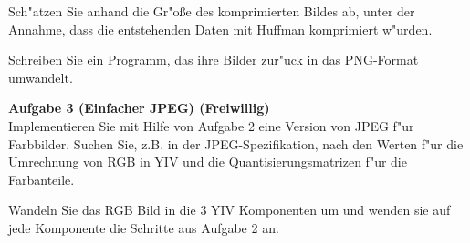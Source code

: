 \documentclass[a4paper]{article}
\begin{document}
Sch"atzen Sie anhand die Gr"o{\ss}e des komprimierten Bildes ab, unter der Annahme, dass die entstehenden Daten mit Huffman komprimiert w"urden.

Schreiben Sie ein Programm, das ihre Bilder zur"uck in das PNG-Format umwandelt.


\bigskip


{\bf Aufgabe 3  \quad(Einfacher JPEG) \quad (Freiwillig)}\\
Implementieren Sie mit Hilfe von Aufgabe 2 eine Version von JPEG f"ur Farbbilder. Suchen Sie, z.B. in der JPEG-Spezifikation, nach den Werten f"ur die Umrechnung von RGB in YIV und die Quantisierungsmatrizen f"ur die Farbanteile.

Wandeln Sie das RGB Bild in die 3 YIV Komponenten um und wenden sie auf jede Komponente die Schritte aus Aufgabe 2 an.
\end{document}
